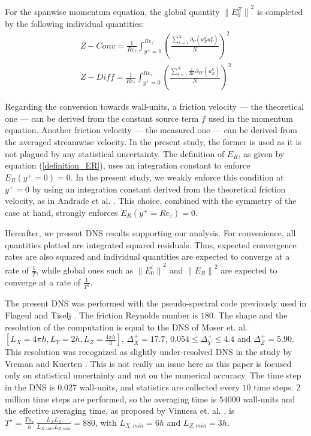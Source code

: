 \documentclass[aip,pof,reprint]{revtex4-1}
\begin{document}
For the spanwise momentum equation, the global quantity ${\parallel{E_0^Z}\parallel}^2$ is completed by the following individual quantities:
\begin{eqnarray}
Z-Conv = \frac{1}{{Re}_\tau} \int_{y^+=0}^{{Re}_\tau} \left( \frac{\sum_{k=1}^N \partial_Y \left( \overline{u_Z^k u_Y^k} \right) }{N} \right)^2 \\
Z-Diff = \frac{1}{{Re}_\tau} \int_{y^+=0}^{{Re}_\tau} \left( \frac{\sum_{k=1}^N \frac{1}{Re}\partial_{YY}\left( \overline{u_Z^k} \right) }{N} \right)^2
\end{eqnarray}

Regarding the conversion towards wall-units, a friction velocity  --- the theoretical one --- can be derived from the constant source term $f$ used in the momentum equation.
Another friction velocity --- the measured one --- can be derived from the averaged streamwise velocity.
In the present study, the former is used as it is not plagued by any statistical uncertainty.
The definition of $E_R$, as given by equation (\ref{definition_ER}), uses an integration constant to enforce $E_R \left( y^+ = 0 \right) = 0$.
In the present study, we weakly enforce this condition at $y^+=0$ by using an integration constant derived from the theoretical friction velocity, as in Andrade et al. \citep{andrade}.
This choice, combined with the symmetry of the case at hand, strongly enforces $E_R \left( y^+ = Re_\tau \right) = 0$.

Hereafter, we present DNS results supporting our analysis.
For convenience, all quantities plotted are integrated squared residuals.
Thus, expected convergence rates are also squared and individual quantities are expected to converge at a rate of $\frac{1}{T}$, while global ones such as ${\parallel{E_0^i}\parallel}^2$ and ${\parallel{E_R}\parallel}^2$ are expected to converge at a rate of $\frac{1}{T^2}$.

The present DNS was performed with the pseudo-spectral code previously used in Flageul and Tiselj \cite{flageul}.
The friction Reynolds number is $180$.
The shape and the resolution of the computation is equal to the DNS of Moser et. al. \cite{moser} $\left[ L_X = 4 \pi h, L_Y = 2h, L_Z = \frac{4 \pi h}{3}\right]$, $\Delta_X^+ = 17.7$, $0.054 \leq \Delta_Y^+ \leq 4.4$ and $\Delta_Z^+ = 5.90$.
This resolution was recognized as slightly under-resolved DNS in the study by Vreman and Kuerten \cite{vreman}.
This {\color{red}is} not really an issue here as this paper is focused only on statistical uncertainty and not on the numerical accuracy.
The time step in the DNS is $0.027$ wall-units, and statistics are collected every $10$ time steps.
$2$ million time steps are performed, so the averaging time is $54000$ wall-units and the effective averaging time, as proposed by Vinuesa et. al. \cite{vinuesa}, is 
$T^\star = \frac{T u_\tau}{h} ~ \frac{L_X L_Z}{L_{X,min} L_{Z,min}} = 880$, with $L_{X,min} = 6h$ and $L_{Z,min} = 3h$.
\end{document}
